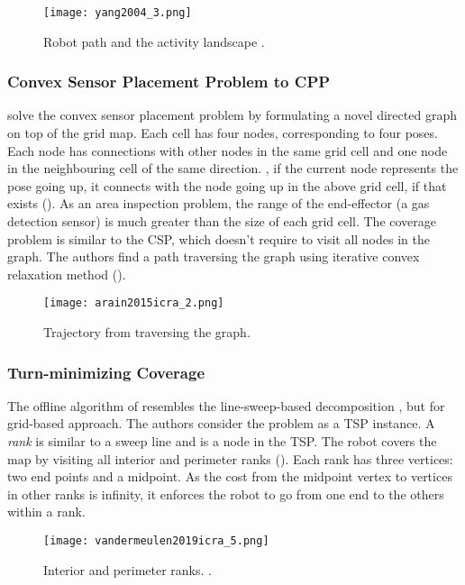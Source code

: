 \begin{figure}[!htb]
	\centering
	\texttt{[image: yang2004\_3.png]}
	\caption{Robot path and the activity landscape \cite{yang2004tsmc}.}
	\label{fig:yang2004_3}
\end{figure}

\subsubsection{Convex Sensor Placement Problem to \ac{CPP}}
 solve the convex sensor placement problem by formulating a novel directed graph on top of the grid map. Each cell has four nodes, corresponding to four poses. Each node has connections with other nodes in the same grid cell and one node in the neighbouring cell of the same direction. \Eg, if the current node represents the pose going up, it connects with the node going up in the above grid cell, if that exists (). As an area inspection problem, the range of the end-effector (a gas detection sensor) is much greater than the size of each grid cell. The coverage problem is similar to the \ac{CSP}, which doesn't require to visit all nodes in the graph. The authors find a path traversing the graph using iterative convex relaxation method ().

\begin{figure}[!htb]
	\centering
	\texttt{[image: arain2015icra\_2.png]}
	\caption{Trajectory from traversing the graph.}
	\label{fig:arain2015icra_2}
\end{figure}

\subsubsection{Turn-minimizing Coverage}
The offline algorithm of  resembles the line-sweep-based decomposition \cite{huang2001icra}, but for grid-based approach. The authors consider the problem as a \ac{TSP} instance. A \textit{rank} is similar to a sweep line and is a node in the \ac{TSP}. The robot covers the map by visiting all interior and perimeter ranks (). Each rank has three vertices: two end points and a midpoint. As the cost from the midpoint vertex to vertices in other ranks is infinity, it enforces the robot to go from one end to the others within a rank.

\begin{figure}[!htb]
	\centering
	\texttt{[image: vandermeulen2019icra\_5.png]}
	\caption{Interior and perimeter ranks. \cite{vandermeulen2019icra}.}
	\label{fig:vandermeulen2019icra_5}
\end{figure} 

\clearpage